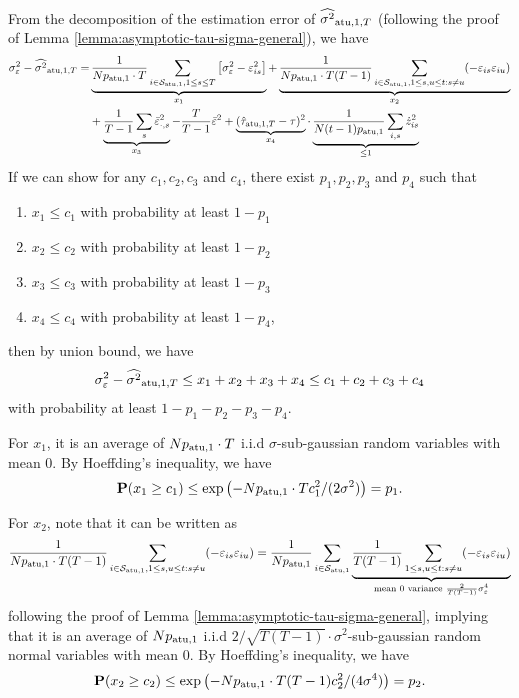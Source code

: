 From the decomposition of the estimation error of $\widehat{\sigma^2}_{\mathrm{atu},1,T}$ (following the proof of Lemma \ref{lemma:asymptotic-tau-sigma-general}), we have 
\begin{align*}
    \sigma_\varepsilon^2 - \widehat{\sigma^2}_{\mathrm{atu},1,T} =& \underbrace{\frac{1}{N  p_{\mathrm{atu},1} \cdot T} \sum_{i \in \mathcal{S}_{\mathrm{atu},1}, 1 \leq s \leq T}\left[ \sigma_\varepsilon^2 - \varepsilon_{is}^2 \right] }_{x_1} + \underbrace{\frac{1}{N  p_{\mathrm{atu},1} \cdot T (T-1) } \sum_{i \in \mathcal{S}_{\mathrm{atu},1}, 1 \leq s, u \leq t: s\neq u}( - \varepsilon_{is} \varepsilon_{iu})}_{x_2}  \\
    & + \underbrace{\frac{1}{T-1} \sum_s \bar{\varepsilon}^2_{\cdot,s} }_{x_3}  - \frac{T}{T-1} \bar{\varepsilon}^2 + \underbrace{(\hat{\tau}_{\mathrm{atu},1,T} - \tau)^2}_{x_4}  \cdot \underbrace{\frac{1}{N(t-1) p_{\mathrm{atu},1}} \sum_{i,s} \dot{z}_{is}^2 }_{ \leq 1}
\end{align*}
If we can show for any $c_1, c_2, c_3$ and $c_4$, there exist $p_1, p_2, p_3$ and $p_4$ such that  
\begin{enumerate}
    \item $x_1 \leq c_1$ with probability at least $1 - p_1$
    \item $x_2 \leq c_2$ with probability at least $1 - p_2$
    \item $x_3 \leq c_3$ with probability at least $1 - p_3$
    \item $x_4 \leq c_4$ with probability at least $1 - p_4$,
\end{enumerate}
then by union bound, we have 
\begin{align*}
    \sigma_\varepsilon^2 - \widehat{\sigma^2}_{\mathrm{atu},1,T} \leq x_1 + x_2 + x_3 + x_4 \leq c_1 + c_2 + c_3 + c_4
\end{align*}
with probability at least $1 - p_1 - p_2 - p_3 - p_4$.

For $x_1$, it is an average of $N p_{\mathrm{atu},1} \cdot T$ i.i.d $\sigma$-sub-gaussian random variables with mean $0$. By Hoeffding's inequality, we have 
\[\mathbf{P}(x_1 \geq c_1) \leq \exp\left(-N  p_{\mathrm{atu},1} \cdot T c_1^2/(2\sigma^2) \right) = p_1.\]

For $x_2$, note that it can be written as
\[\frac{1}{N  p_{\mathrm{atu},1} \cdot T (T-1) } \sum_{i \in \mathcal{S}_{\mathrm{atu},1}, 1 \leq s, u \leq t: s\neq u}( - \varepsilon_{is} \varepsilon_{iu}) = \frac{1}{N p_{\mathrm{atu},1}} \sum_{i \in \mathcal{S}_{\mathrm{atu},1}} \underbrace{\frac{1}{T(T-1)} \sum_{1 \leq s, u \leq t: s\neq u} ( - \varepsilon_{is} \varepsilon_{iu})}_{\text{mean 0 variance $\frac{2}{T(T-1) } \sigma_\varepsilon^4$}} \]
following the proof of Lemma \ref{lemma:asymptotic-tau-sigma-general}, implying that it is an average of $N p_{\mathrm{atu},1}$ i.i.d $2/\sqrt{T(T-1)} \cdot \sigma^2$-sub-gaussian random normal variables with mean $0$. By Hoeffding's inequality, we have 
\[\mathbf{P}(x_2 \geq c_2) \leq \exp\left(-N  p_{\mathrm{atu},1} \cdot T (T-1) c_2^2/(4\sigma^4) \right)= p_2.  \]

